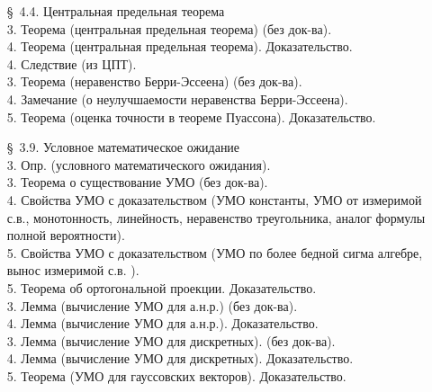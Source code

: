 \documentclass[10pt]{amsart}
\begin{document}
\begin{enumerate}
\begin{enumerate}
 

\item[\S\, 4.4.] Центральная предельная теорема \\
3. Теорема (центральная предельная теорема) (без док-ва). \\
4. Теорема (центральная предельная теорема). Доказательство. \\        
4. Следствие (из ЦПТ). \\
3. Теорема (неравенство Берри-Эссеена) (без док-ва). \\
4. Замечание (о неулучшаемости неравенства Берри-Эссеена). \\
5. Теорема (оценка точности в теореме Пуассона). Доказательство. \\
    
    
\item[\S\, 3.9.] Условное математическое ожидание \\
3. Опр. (условного математического ожидания). \\
3. Теорема о существование УМО (без док-ва). \\
4. Свойства УМО с доказательством (УМО константы, УМО от измеримой с.в., монотонность,  линейность, неравенство треугольника,  аналог формулы полной вероятности). \\
5. Свойства УМО с доказательством (УМО по более бедной сигма алгебре, вынос измеримой с.в. ). \\
5. Теорема об ортогональной проекции. Доказательство. \\
3. Лемма (вычисление УМО для а.н.р.)  (без док-ва). \\
4. Лемма (вычисление УМО для а.н.р.). Доказательство. \\
3. Лемма (вычисление УМО для дискретных). (без док-ва). \\
4. Лемма (вычисление УМО для дискретных). Доказательство. \\
5. Теорема (УМО для гауссовских векторов). Доказательство. \\










    \end{enumerate}
    

\end{enumerate}
\end{document}
